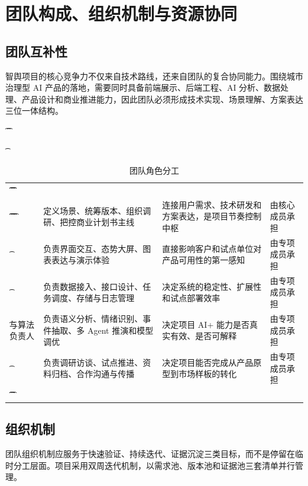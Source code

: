 \chapter{团队构成、组织机制与资源协同}

\section{团队互补性}

智舆项目的核心竞争力不仅来自技术路线，还来自团队的复合协同能力。围绕城市治理型 AI 产品的落地，需要同时具备前端展示、后端工程、AI 分析、数据处理、产品设计和商业推进能力，因此团队必须形成技术实现、场景理解、方案表达三位一体结构。

\begin{table}[htbp]
	\t\centering
	\t\caption{团队角色分工}
	\t\begin{tabularx}{\textwidth}{|L{2.6cm}L{3.2cm}YL{2.8cm}|}
		\t\t\toprule
		\t\t{} &                    &              &  \\
		\t\t\midrule
		\t\t{}
		\t{}        & 定义场景、统筹版本、组织调研、把控商业计划书主线         & 连接用户需求、技术研发和方案表达，是项目节奏控制中枢 & 由核心成员承担        \\
		\t{}    & 负责界面交互、态势大屏、图表表达与演示体验            & 直接影响客户和试点单位对产品可用性的第一感知     & 由专项成员承担        \\
		\t{}   & 负责数据接入、接口设计、任务调度、存储与日志管理         & 决定系统的稳定性、扩展性和试点部署效率        & 由专项成员承担        \\
		\t\tAI 与算法负责人    & 负责语义分析、情绪识别、事件抽取、多 Agent 推演和模型调优 & 决定项目 AI+ 能力是否真实有效、是否可解释    & 由专项成员承担        \\
		\t{}     & 负责调研访谈、试点推进、资料归档、合作沟通与传播         & 决定项目能否完成从产品原型到市场样板的转化      & 由专项成员承担        \\
		\t\t\bottomrule
		\t\end{tabularx}
\end{table}

\section{组织机制}

团队组织机制应服务于快速验证、持续迭代、证据沉淀三类目标，而不是停留在临时分工层面。项目采用双周迭代机制，以需求池、版本池和证据池三套清单并行管理。

